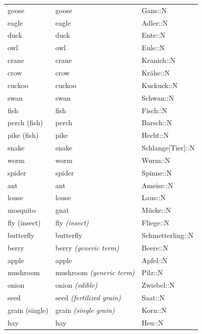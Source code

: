 \begin{center}
\begin{longtable}{lll}
{\sc \lowercase{	GOOSE	}}	&	goose		&	Gans::N	\\
{\sc \lowercase{	EAGLE	}}	&	eagle		&	Adler::N	\\
{\sc \lowercase{	DUCK	}}	&	duck		&	Ente::N	\\
{\sc \lowercase{	OWL	}}	&	owl		&	Eule::N	\\
{\sc \lowercase{	CRANE	}}	&	crane		&	Kranich::N	\\
{\sc \lowercase{	CROW	}}	&	crow		&	Krähe::N	\\
{\sc \lowercase{	CUCKOO	}}	&	cuckoo		&	Kuckuck::N	\\
{\sc \lowercase{	SWAN	}}	&	swan		&	Schwan::N	\\
{\sc \lowercase{	FISH	}}	&	fish		&	Fisch::N	\\
{\sc \lowercase{	PERCH \footnotesize (FISH)	}}	&	perch		&	Barsch::N	\\
{\sc \lowercase{	PIKE \footnotesize (FISH)	}}	&	pike		&	Hecht::N	\\
{\sc \lowercase{	SNAKE	}}	&	snake		&	Schlange[Tier]::N	\\
{\sc \lowercase{	WORM	}}	&	worm		&	Wurm::N	\\
{\sc \lowercase{	SPIDER	}}	&	spider		&	Spinne::N	\\
{\sc \lowercase{	ANT	}}	&	ant		&	Ameise::N	\\
{\sc \lowercase{	LOUSE	}}	&	louse		&	Laus::N	\\
{\sc \lowercase{	MOSQUITO	}}	&	gnat		&	Mücke::N	\\
{\sc \lowercase{	FLY \footnotesize (INSECT)	}}	&	fly	\textit{\footnotesize (insect)}	&	Fliege::N	\\
{\sc \lowercase{	BUTTERFLY	}}	&	butterfly		&	Schmetterling::N	\\
{\sc \lowercase{	BERRY	}}	&	berry	\textit{\footnotesize (generic term)}	&	Beere::N	\\
{\sc \lowercase{	APPLE	}}	&	apple		&	Apfel::N	\\
{\sc \lowercase{	MUSHROOM	}}	&	mushroom	\textit{\footnotesize (generic term)}	&	Pilz::N	\\
{\sc \lowercase{	ONION	}}	&	onion	\textit{\footnotesize (edible)}	&	Zwiebel::N	\\
{\sc \lowercase{	SEED	}}	&	seed	\textit{\footnotesize (fertilized grain)}	&	Saat::N	\\
{\sc \lowercase{	GRAIN \footnotesize (SINGLE)	}}	&	grain	\textit{\footnotesize (single grain)}	&	Korn::N	\\
{\sc \lowercase{	HAY	}}	&	hay		&	Heu::N	\\

\end{longtable}
\end{center}
